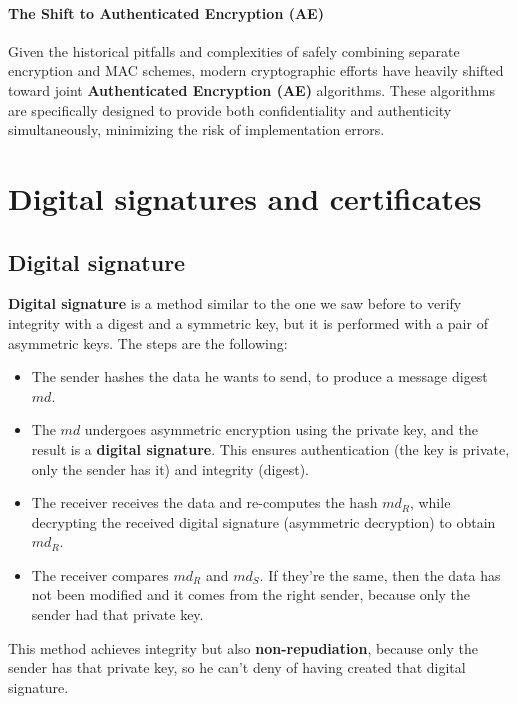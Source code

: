 \paragraph{The Shift to Authenticated Encryption (AE)}
Given the historical pitfalls and complexities of safely combining separate encryption and MAC schemes, modern cryptographic efforts have heavily shifted toward joint \textbf{Authenticated Encryption (AE)} algorithms. These algorithms are specifically designed to provide both confidentiality and authenticity simultaneously, minimizing the risk of implementation errors.

\section{Digital signatures and certificates}
\subsection{Digital signature}
\textbf{Digital signature} is a method similar to the one we saw before to verify integrity with a digest and a symmetric key, but it is performed with a pair of asymmetric keys. The steps are the following:
\begin{itemize}
    \item The sender hashes the data he wants to send, to produce a message digest $md$.
    \item The $md$ undergoes asymmetric encryption using the private key, and the result is a \textbf{digital signature}. This ensures authentication (the key is private, only the sender has it) and integrity (digest).
    \item The receiver receives the data and re-computes the hash $md_R$, while decrypting the received digital signature (asymmetric decryption) to obtain $md_R$.
    \item The receiver compares $md_R$ and $md_S$. If they're the same, then the data has not been modified and it comes from the right sender, because only the sender had that private key.
\end{itemize}
This method achieves integrity but also \textbf{non-repudiation}, because only the sender has that private key, so he can't deny of having created that digital signature.


